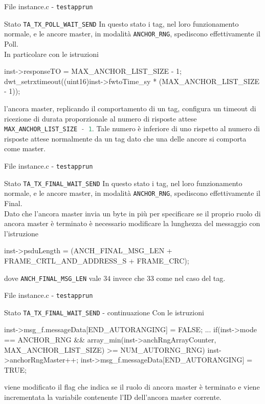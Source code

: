 \begin{frame}[fragile, shrink=10]{File instance.c - \lstinline[language=C]!testapprun!}
  \begin{block}{Stato \lstinline[language=C]!TA_TX_POLL_WAIT_SEND!}
    In questo stato i tag, nel loro funzionamento normale, e le ancore master, in modalità
    \lstinline[language=C]!ANCHOR_RNG!, spediscono effettivamente il Poll.\\
    In particolare con le istruzioni
    \begin{C}
      inst->responseTO = MAX_ANCHOR_LIST_SIZE - 1;
      dwt_setrxtimeout((uint16)inst->fwtoTime_sy * (MAX_ANCHOR_LIST_SIZE - 1));
    \end{C}
    l'ancora master, replicando il comportamento di un tag, configura un timeout di ricezione
    di durata proporzionale al numero di risposte attese \lstinline[language=C]!MAX_ANCHOR_LIST_SIZE - 1!.
    Tale numero è inferiore di uno rispetto al numero di risposte attese normalmente da un tag
    dato che una delle ancore si comporta come master.
  \end{block}
\end{frame}

\begin{frame}[fragile]{File instance.c - \lstinline[language=C]!testapprun!}
  \begin{block}{Stato \lstinline[language=C]!TA_TX_FINAL_WAIT_SEND!}
    In questo stato i tag, nel loro funzionamento normale, e le ancore master, in modalità
    \lstinline[language=C]!ANCHOR_RNG!, spediscono effettivamente il Final.\\
    Dato che l'ancora master invia un byte in più per specificare se il \alert{proprio} ruolo di ancora master
    è terminato è necessario modificare la lunghezza del messaggio con l'istruzione
    \begin{C}
      inst->psduLength = (ANCH_FINAL_MSG_LEN + FRAME_CRTL_AND_ADDRESS_S + FRAME_CRC);
    \end{C}
    dove \lstinline[language=C]!ANCH_FINAL_MSG_LEN! vale $34$ invece che $33$ come nel caso del tag.
  \end{block}
\end{frame}

\begin{frame}[fragile]{File instance.c - \lstinline[language=C]!testapprun!}
  \begin{block}{Stato \lstinline[language=C]!TA_TX_FINAL_WAIT_SEND! - continuazione}
    Con le istruzioni
    \begin{C}
      inst->msg_f.messageData[END_AUTORANGING] = FALSE;
      ...
      if(inst->mode == ANCHOR_RNG && 
      array_min(inst->anchRngArrayCounter, MAX_ANCHOR_LIST_SIZE) >= NUM_AUTORNG_RNG)
      {
        inst->anchorRngMaster++;
        inst->msg_f.messageData[END_AUTORANGING] = TRUE;
      }
    \end{C}
    viene modificato il flag che indica se il ruolo di ancora master è terminato e viene
    incrementata la variabile contenente l'ID dell'ancora master corrente.
  \end{block}
\end{frame}

